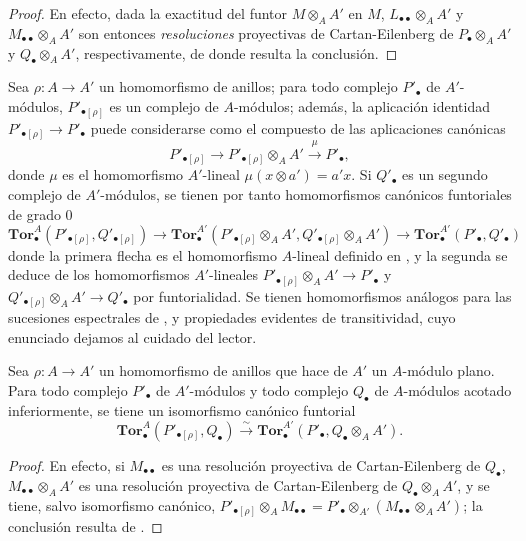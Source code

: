 \begin{proof}
En efecto, dada la exactitud del funtor $M\otimes_A A'$ en $M$,
$L_{\bullet\bullet}\otimes_A A'$ y $M_{\bullet\bullet}\otimes_A A'$ son
entonces \emph{resoluciones} proyectivas de Cartan-Eilenberg de
$P_\bullet\otimes_A A'$ y $Q_\bullet\otimes_A A'$, respectivamente, de
donde resulta la conclusión.
\end{proof}

\begin{env}[6.3.10]
\label{III.6.3.10}
Sea $\rho:A\to A'$ un homomorfismo de anillos; para todo complejo
$P'_\bullet$ de $A'$-módulos, $P'_{\bullet[\rho]}$ es un complejo de
$A$-módulos; además, la aplicación identidad
$P'_{\bullet[\rho]}\to P'_\bullet$ puede considerarse como el compuesto de
las aplicaciones canónicas
\[
  P'_{\bullet[\rho]}\longrightarrow
  P'_{\bullet[\rho]}\otimes_A A'
  \xrightarrow{\mu}P'_\bullet,
\]
donde $\mu$ es el homomorfismo $A'$-lineal $\mu(x\otimes a')=a'x$. Si
$Q'_\bullet$
es un segundo complejo de $A'$-módulos, se tienen por tanto homomorfismos
canónicos funtoriales de grado 0
\[
  \mathbf{Tor}_\bullet^A(P'_{\bullet[\rho]},Q'_{\bullet[\rho]})
  \longrightarrow
  \mathbf{Tor}_\bullet^{A'}
  (P'_{\bullet[\rho]}\otimes_A A',Q'_{\bullet[\rho]}\otimes_A A')
  \longrightarrow
  \mathbf{Tor}_\bullet^{A'}(P'_\bullet,Q'_\bullet)
  \tag{6.3.10.1}\label{III.6.3.10.1.fr}
\]
donde la primera flecha es el homomorfismo $A$-lineal definido en
, y la
segunda se deduce de los homomorfismos $A'$-lineales
$P'_{\bullet[\rho]}\otimes_A A'\to P'_\bullet$ y
$Q'_{\bullet[\rho]}\otimes_A A'\to Q'_\bullet$ por funtorialidad. Se tienen
homomorfismos análogos para las sucesiones espectrales de
, y
propiedades evidentes de transitividad, cuyo enunciado dejamos al cuidado del
lector.
\end{env}

\begin{proposition}[6.3.11]
\label{III.6.3.11}
Sea $\rho:A\to A'$ un homomorfismo de anillos que hace de $A'$ un
$A$-módulo plano. Para todo complejo $P'_\bullet$ de $A'$-módulos y todo
complejo $Q_\bullet$ de $A$-módulos acotado inferiormente, se tiene un
isomorfismo canónico funtorial
\[
  \mathbf{Tor}_\bullet^A(P'_{\bullet[\rho]},Q_\bullet)
  \xrightarrow{\sim}
  \mathbf{Tor}_\bullet^{A'}(P'_\bullet,Q_\bullet\otimes_A A').
  \tag{6.3.11.1}\label{III.6.3.11.1.fr}
\]
\end{proposition}

\begin{proof}
En efecto, si $M_{\bullet\bullet}$ es una resolución proyectiva de
Cartan-Eilenberg de $Q_\bullet$, $M_{\bullet\bullet}\otimes_A A'$ es una
resolución proyectiva de Cartan-Eilenberg de $Q_\bullet\otimes_A A'$, y se
tiene, salvo isomorfismo canónico,
$P'_{\bullet[\rho]}\otimes_A M_{\bullet\bullet}
=P'_\bullet\otimes_{A'}(M_{\bullet\bullet}\otimes_A A')$;
la conclusión resulta de .
\end{proof}

